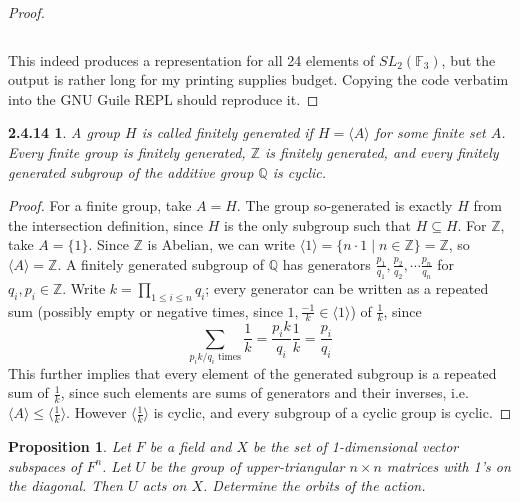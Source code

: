 \documentclass{article}
\newtheorem*{2.4.14}{2.4.14}
\newtheorem{prop}{Proposition}
\begin{document}
\begin{proof}
\begin{verbatim}
\end{verbatim}

  This indeed produces a representation for all 24 elements of $SL_{2}(\mathbb{F}_{3})$, but the output is rather long for my printing supplies budget.
  Copying the code verbatim into the GNU Guile REPL should reproduce it.
 \end{proof}

\begin{2.4.14}
  A group $H$ is called finitely generated if $H = \langle A \rangle$ for some finite set $A$.
  Every finite group is finitely generated, $\mathbb{Z}$ is finitely generated,
  and every finitely generated subgroup of the additive group $\mathbb{Q}$ is cyclic.
\end{2.4.14}

\begin{proof}
  For a finite group, take $A=H$.
  The group so-generated is exactly $H$ from the intersection definition, since $H$ is the only subgroup such that $H\subseteq H$.
  For $\mathbb{Z}$, take $A = \{1\}$.
  Since $\mathbb{Z}$ is Abelian, we can write $\langle 1 \rangle = \{n\cdot 1\mid n\in\mathbb{Z} \} = \mathbb{Z}$, so $\langle A\rangle = \mathbb{Z}$.
  A finitely generated subgroup of $\mathbb{Q}$ has generators $\frac{p_{1}}{q_{1}}, \frac{p_{2}}{q_{2}}, \cdots \frac{p_{n}}{q_{n}}$
  for $q_{i},p_{i}\in\mathbb{Z}$.
  Write $k = \prod_{1\leq i \leq n}q_{i}$; every generator can be written as a repeated sum
  (possibly empty or negative times, since $1,\frac{-1}{k}\in\langle 1 \rangle$) of $\frac{1}{k}$, since
  \[
    \sum_{p_{i}k / q_{i} \text{ times}}\frac{1}{k} = \frac{p_{i}k}{q_{i}}\frac{1}{k} = \frac{p_{i}}{q_{i}}
  \]
  This further implies that every element of the generated subgroup is a repeated sum of $\frac{1}{k}$,
  since such elements are sums of generators and their inverses, i.e. $\langle A \rangle\leq \langle \frac{1}{k} \rangle$.
  However $\langle \frac{1}{k} \rangle$ is cyclic, and every subgroup of a cyclic group is cyclic.
\end{proof}

\begin{prop}
  Let $F$ be a field and $X$ be the set of 1-dimensional vector subspaces of $F^{n}$.
  Let $U$ be the group of upper-triangular $n\times n$ matrices with 1's on the diagonal.
  Then $U$ acts on $X$.
  Determine the orbits of the action.
\end{prop}
\end{document}
